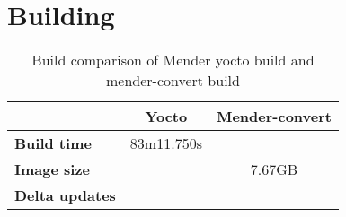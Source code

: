 \documentclass[../../main.tex]{subfiles}
\begin{document}
\section{Building}%
\label{sec:building}

\begin{table}[h]
	\centering
	\caption{Build comparison of Mender yocto build and mender-convert build}
	\label{tab:build_comp}
	\begin{tabular}{l|cc}
		& \textbf{Yocto} & \textbf{Mender-convert}\\
		\hline
		\textbf{Build time}&83m11.750s&\\
		\textbf{Image size}&&7.67GB\\
		\textbf{Delta updates}&&
	\end{tabular}
\end{table}
\end{document}
